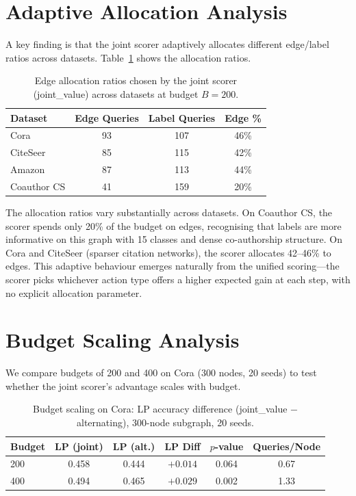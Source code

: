 \documentclass[12pt,a4paper,oneside]{report}
\begin{document}
\section{Adaptive Allocation Analysis}

A key finding is that the joint scorer adaptively allocates different edge/label ratios across datasets. Table~\ref{tab:allocation} shows the allocation ratios.

\begin{table}[htbp]
\centering
\caption{Edge allocation ratios chosen by the joint scorer (joint\_value) across datasets at budget $B=200$.}
\label{tab:allocation}
\small
\begin{tabular}{lccc}
\toprule
Dataset & Edge Queries & Label Queries & Edge \% \\
\midrule
Cora        & 93  & 107 & 46\% \\
CiteSeer    & 85  & 115 & 42\% \\
Amazon      & 87  & 113 & 44\% \\
Coauthor CS & 41  & 159 & 20\% \\
\bottomrule
\end{tabular}
\end{table}

The allocation ratios vary substantially across datasets. On Coauthor CS, the scorer spends only 20\% of the budget on edges, recognising that labels are more informative on this graph with 15 classes and dense co-authorship structure. On Cora and CiteSeer (sparser citation networks), the scorer allocates 42--46\% to edges. This adaptive behaviour emerges naturally from the unified scoring---the scorer picks whichever action type offers a higher expected gain at each step, with no explicit allocation parameter.

\section{Budget Scaling Analysis}
\label{sec:budget}

We compare budgets of 200 and 400 on Cora (300 nodes, 20 seeds) to test whether the joint scorer's advantage scales with budget.

\begin{table}[htbp]
\centering
\caption{Budget scaling on Cora: LP accuracy difference (joint\_value $-$ alternating), 300-node subgraph, 20 seeds.}
\label{tab:budget}
\small
\begin{tabular}{lccccc}
\toprule
Budget & LP (joint) & LP (alt.) & LP Diff & $p$-value & Queries/Node \\
\midrule
200 & 0.458 & 0.444 & $+0.014$ & 0.064 & 0.67 \\
400 & 0.494 & 0.465 & $+0.029$ & 0.002 & 1.33 \\
\bottomrule
\end{tabular}
\end{table}
\end{document}
